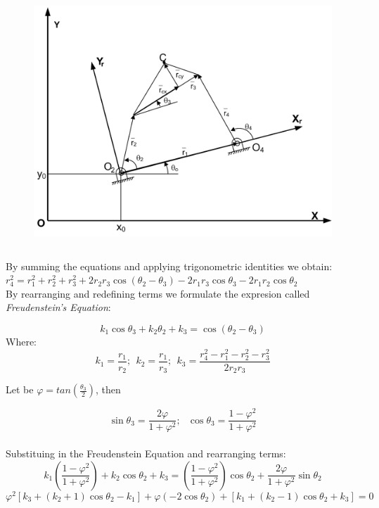 \documentclass[]{beamer}
\begin{document}
{{\begin{columns}[T]
\begin{column}{.5\textwidth}
   \begin{figure}
    \centering
    \includegraphics[width = 1.0\textwidth]{mecha.png}
    \caption{}
  \end{figure}
  
    \end{column}
  \end{columns}
 }
 {
 	By summing the equations and applying trigonometric identities we obtain:\\
 	\vspace{0.5cm}
 	$r_4^2 = r_1^2 + r_2^2 + r_3^2 + 2r_2 r_3 \cos(\theta_2-\theta_3)- 2 r_1 r_3 \cos \theta_3 -2r_1 r_2 \cos \theta_2$\\
 	\vspace{0.5cm}
 	By rearranging and redefining terms we formulate the expresion called \emph{Freudenstein's Equation}:

	$$k_1 \cos \theta_3 + k_2 \theta_2 + k_3 = \cos (\theta_2 - \theta_3)$$
	Where:
	$$k_1=\frac{r_1}{r_2};~~ k_2=\frac{r_1}{r_3};~~ k_3=\frac{r_4^2-r_1^2 - r_2^2 - r_3^2}{2r_2 r_3}$$
 	
 }
 {
 Let be $\varphi=tan (\frac{\theta_3}{2})$, then
 
 $$\sin \theta_3 = \frac{2 \varphi}{1+\varphi^2};~~~ \cos \theta_3= \frac{1-\varphi^2}{1+\varphi^2}$$\\
 
 \vspace{0.5cm}
 Substituing in the Freudenstein Equation and rearranging terms:\\
 
 $$k_1(\frac{1-\varphi^2}{1+\varphi^2})+ k_2 \cos \theta_2 + k_3 = (\frac{1-\varphi^2}{1+\varphi^2}) \cos \theta_2 + \frac{2 \varphi}{1+\varphi^2} \sin \theta_2$$
 $$\varphi^2[k_3+(k_2+1)\cos \theta_2 -k_1]+ \varphi(-2\cos \theta_2) + [k_1+(k_2-1)\cos \theta_2 + k_3]=0$$ 
 
}}
\end{document}
